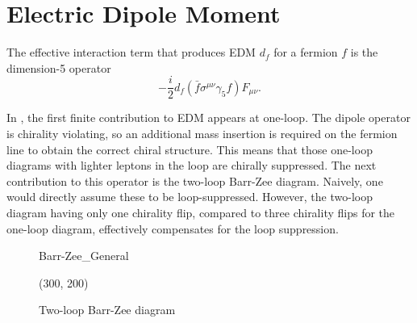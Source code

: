 \chapter{Electric Dipole Moment}
\label{ch:EDM}

The effective interaction term that produces EDM \(d_{f} \) for a fermion \(f \) is the dimension-5 operator
\begin{equation}
  -\frac{i}{2}d_{f}\left(\bar{f}\sigma^{\mu\nu}\gamma_{5}f\right)F_{\mu\nu}.
\end{equation}

In {\gthdm}, the first finite contribution to EDM appears at one-loop.
The dipole operator is chirality violating, so an additional mass insertion is required on the fermion line to obtain the correct chiral structure.
This means that those one-loop diagrams with lighter leptons in the loop are chirally suppressed.
The next contribution to this operator is the two-loop Barr-Zee diagram. 
Naively, one would directly assume these to be loop-suppressed. 
However, the two-loop diagram having only one chirality flip, compared to three chirality flips for the one-loop diagram, 
effectively compensates for the loop suppression.

\begin{figure}[p]
	\centering
	\begin{fmffile}{Barr-Zee_General}
		\begin{fmfgraph*}(300, 200)
			\fmffreeze
			\fmffreeze
		\end{fmfgraph*}
	\end{fmffile}

	\caption{Two-loop Barr-Zee diagram}
	\label{fig:BarrZee_general}
\end{figure}


